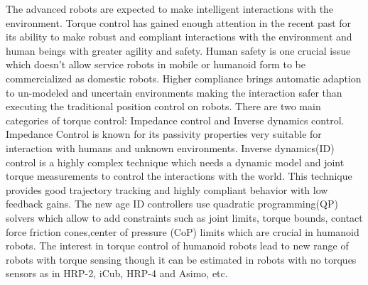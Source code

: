 The advanced robots are expected to make intelligent interactions with the environment. Torque control has gained enough attention in the recent past for its ability to make robust and compliant interactions with the environment and human beings with greater agility and safety. Human safety is one crucial issue which doesn't allow service robots in mobile or humanoid form to be commercialized as domestic robots. Higher compliance brings automatic adaption to un-modeled and uncertain environments making the interaction safer than executing the traditional position control on robots. There are two main categories of torque control: Impedance control and Inverse dynamics control. Impedance Control \cite{part1985impedance,albu2007unified,ott2008passivity,schaffer2008soft} is known for its passivity properties very suitable for interaction with humans and unknown environments. Inverse dynamics(ID) control \cite{del2016implementing,buchli2009compliant,righetti2013optimal} is a highly complex technique which needs a dynamic model and joint torque measurements to control the interactions with the world. This technique provides good trajectory tracking and highly compliant behavior with low feedback gains. The new age ID controllers use quadratic programming(QP) solvers which allow to add constraints such as joint limits, torque bounds, contact force friction cones,center of pressure (CoP) limits which are crucial in humanoid robots. The interest in torque control of humanoid robots lead to new range of robots with torque sensing though it can be estimated in robots with no torques sensors as in HRP-2, iCub, HRP-4 and Asimo, etc.
